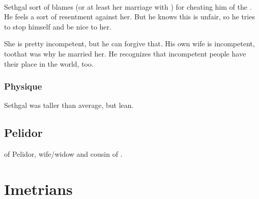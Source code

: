 \subsubsection{\Tiroco}
Sethgal sort of blames  (or at least her marriage with \Icor) for cheating him of the \rayuthship. 
He feels a sort of resentment against her. 
But he knows this is unfair, so he tries to stop himself and be nice to her. 

She is pretty incompetent, but he can forgive that. 
His own wife is incompetent, too\dash that was why he married her. 
He recognizes that incompetent people have their place in the world, too. 









\subsection{Physique}
Sethgal was taller than average, but lean. 

















\section{\Tiroco{} Pelidor}
\Rinyuth of Pelidor, wife/widow and cousin of . 























\chapter{Imetrians}















